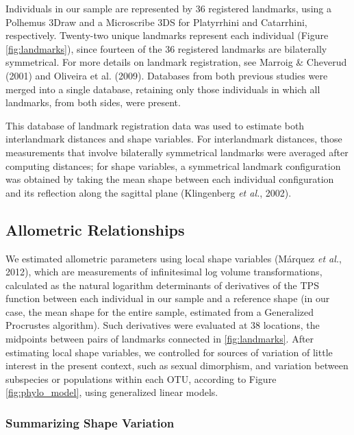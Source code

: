 \documentclass[12pt,twoside]{report}
\begin{document}
Individuals in our sample are represented by 36 registered landmarks,
using a Polhemus 3Draw and a Microscribe 3DS for Platyrrhini and
Catarrhini, respectively. Twenty-two unique landmarks represent each
individual (Figure \ref{fig:landmarks}), since fourteen of the 36
registered landmarks are bilaterally symmetrical. For more details on
landmark registration, see Marroig \& Cheverud (2001) and Oliveira et
al. (2009). Databases from both previous studies were merged into a
single database, retaining only those individuals in which all
landmarks, from both sides, were present.

This database of landmark registration data was used to estimate both
interlandmark distances and shape variables. For interlandmark
distances, those measurements that involve bilaterally symmetrical
landmarks were averaged after computing distances; for shape variables,
a symmetrical landmark configuration was obtained by taking the mean
shape between each individual configuration and its reflection along the
sagittal plane (Klingenberg \emph{et al.}, 2002).

\subsection{Allometric Relationships}\label{allometric-relationships}

We estimated allometric parameters using local shape variables (Márquez
\emph{et al.}, 2012), which are measurements of infinitesimal log volume
transformations, calculated as the natural logarithm determinants of
derivatives of the TPS function between each individual in our sample
and a reference shape (in our case, the mean shape for the entire
sample, estimated from a Generalized Procrustes algorithm). Such
derivatives were evaluated at 38 locations, the midpoints between pairs
of landmarks connected in \autoref{fig:landmarks}. After estimating
local shape variables, we controlled for sources of variation of little
interest in the present context, such as sexual dimorphism, and
variation between subspecies or populations within each OTU, according
to Figure \ref{fig:phylo_model}, using generalized linear models.

\subsubsection{Summarizing Shape
Variation}\label{summarizing-shape-variation}
\end{document}
